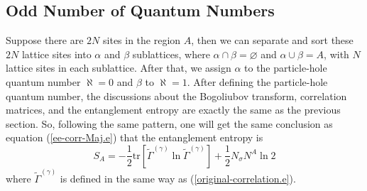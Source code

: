 \documentclass[12font]{article}
\theoremstyle{definition}
\numberwithin{equation}{section}
\newcommand{\lrm}[1]{\left[  #1  \right]}
\newcommand{\mrm}[1]{\mathrm{#1}}
\newcommand{\tr}{\mrm{tr}}
\begin{document}
\subsection{Odd Number of Quantum Numbers}
Suppose there are $2N$ sites in the region $A$, then we can separate and sort these $2N$ lattice sites into $\alpha$ and $\beta$ sublattices, where $\alpha\cap\beta=\varnothing$ and $\alpha\cup\beta=A$, with $N$ lattice sites in each sublattice. After that, we assign $\alpha$ to the particle-hole quantum number $\aleph=0$ and $\beta$ to $\aleph=1$. After defining the particle-hole quantum number, the discussions about the Bogoliubov transform, correlation matrices, and the entanglement entropy are exactly the same as the previous section. So, following the same pattern, one will get the same conclusion as equation (\ref{ee-corr-Maj.e}) that the entanglement entropy is
\[
S_A = -\frac{1}{2}\tr\lrm{\tilde{\Gamma}^{(\gamma)}\ln\tilde{\Gamma}^{(\gamma)}} + \frac{1}{2}N_{\sigma}N^A\ln 2
\]
where $\tilde{\Gamma}^{(\gamma)}$ is defined in the same way as (\ref{original-correlation.e}).
\end{document}

